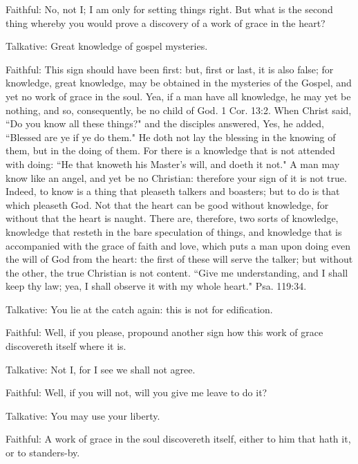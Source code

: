 Faithful: No, not I; I am only for setting things right. But what is the second thing whereby you would prove a discovery of a work of grace in the heart?

Talkative: Great knowledge of gospel mysteries.

Faithful: This sign should have been first: but, first or last, it is also false; for knowledge, great knowledge, may be obtained in the mysteries of the Gospel, and yet no work of grace in the soul. Yea, if a man have all knowledge, he may yet be nothing, and so, consequently, be no child of God. 1 Cor. 13:2. When Christ said, ``Do you know all these things?" and the disciples answered, Yes, he added, ``Blessed are ye if ye do them." He doth not lay the blessing in the knowing of them, but in the doing of them. For there is a knowledge that is not attended with doing: ``He that knoweth his Master's will, and doeth it not." A man may know like an angel, and yet be no Christian: therefore your sign of it is not true. Indeed, to know is a thing that pleaseth talkers and boasters; but to do is that which pleaseth God. Not that the heart can be good without knowledge, for without that the heart is naught. There are, therefore, two sorts of knowledge, knowledge that resteth in the bare speculation of things, and knowledge that is accompanied with the grace of faith and love, which puts a man upon doing even the will of God from the heart: the first of these will serve the talker; but without the other, the true Christian is not content. ``Give me understanding, and I shall keep thy law; yea, I shall observe it with my whole heart." Psa. 119:34.

Talkative: You lie at the catch again: this is not for edification.

Faithful: Well, if you please, propound another sign how this work of grace discovereth itself where it is.

Talkative: Not I, for I see we shall not agree.

Faithful: Well, if you will not, will you give me leave to do it?

Talkative: You may use your liberty.

Faithful: A work of grace in the soul discovereth itself, either to him that hath it, or to standers-by.

